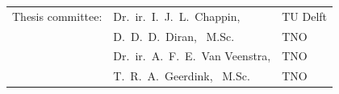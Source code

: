 \begin{titlepage}
\begin{center}
\begin{tabular}{lll}
    Thesis committee:
        & Dr.\ ir.\ I.\ J.\ L.\ Chappin, & TU Delft \\
        & D.\ D.\ D.\ Diran, \ M.Sc. & TNO \\
        & Dr.\ ir.\ A.\ F.\ E.\ Van Veenstra, & TNO   \\ 
        & T.\ R.\ A.\ Geerdink, \ M.Sc. & TNO 
\end{tabular}

\bigskip
\bigskip

\bigskip
\bigskip

\end{center}

\end{titlepage}

